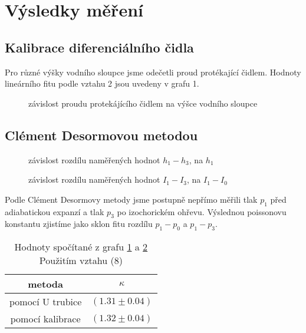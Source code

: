 \documentclass[a4paper,11pt]{article}
\begin{document}
\section{Výsledky měření}

\subsection{Kalibrace diferenciálního čidla}

Pro různé výšky vodního sloupce jsme odečetli proud protékající čidlem. 
Hodnoty lineárního fitu podle vztahu 2 jsou uvedeny v grafu 1.

\begin{figure}[ht]
  \centering
  
  \caption{závislost proudu protekájícího čidlem na výšce vodního sloupce}
\end{figure}

\subsection{Clément Desormovou metodou}

\begin{figure}[ht]
  \centering
  
  \caption{závislost rozdílu naměřených hodnot $h_1 - h_3$, na $h_1$}
  \label{fig:2}
\end{figure}

\newpage

\begin{figure}[ht]
  \centering
  
  \caption{závislost rozdílu naměřených hodnot $I_1 - I_3$, na $I_1 - I_0$}
  \label{fig:3}
\end{figure}

Podle Clément Desormovy metody jsme postupně nepřímo měřili tlak $p_1$ před adiabatickou expanzí a tlak $p_3$ po 
izochorickém ohřevu. Výslednou poissonovu konstantu zjistíme jako sklon fitu rozdílu $p_1 - p_0$ a $p_1 - p_3$.

\begin{table}[ht]
  \centering
  \begin{tabular}{c | c }
    metoda & $\kappa$ \\ \hline\hline
    pomocí U trubice & $(1.31 \pm 0.04)$ \\
    pomocí kalibrace & $(1.32 \pm 0.04)$ \\ \hline
  \end{tabular}
  \caption{Hodnoty spočítané z grafu \ref{fig:2} a \ref{fig:3} Použitím vztahu (8)}
\end{table}
\end{document}
